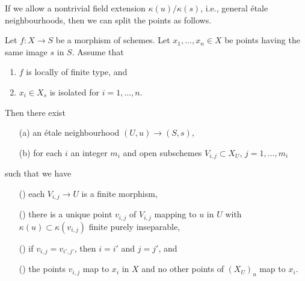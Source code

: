 \noindent
If we allow a nontrivial field extension $\kappa(u)/\kappa(s)$, i.e.,
general \'etale neighbourhoods, then we can split the points as follows.

\begin{lemma}
\label{lemma-etale-makes-quasi-finite-finite-multiple-points-var}
Let $f : X \to S$ be a morphism of schemes.
Let $x_1, \ldots, x_n \in X$ be points having the same image $s$ in $S$.
Assume that
\begin{enumerate}
\item $f$ is locally of finite type, and
\item $x_i \in X_s$ is isolated for $i = 1, \ldots, n$.
\end{enumerate}
Then there exist
\begin{enumerate}
\item[(a)] an \'etale neighbourhood $(U, u) \to (S, s)$,
\item[(b)] for each $i$ an integer $m_i$ and
open subschemes $V_{i, j} \subset X_U$, $j = 1, \ldots, m_i$
\end{enumerate}
such that we have
\begin{enumerate}
\item[(\romannumeral1)] each $V_{i, j} \to U$ is a finite morphism,
\item[(\romannumeral2)] there is a unique point $v_{i, j}$ of $V_{i, j}$
mapping to $u$ in $U$ with $\kappa(u) \subset \kappa(v_{i, j})$
finite purely inseparable,
\item[(\romannumeral4)] if $v_{i, j} = v_{i', j'}$, then $i = i'$ and
$j = j'$, and
\item[(\romannumeral3)] the points $v_{i, j}$ map to $x_i$ in $X$ and
no other points of $(X_U)_u$ map to $x_i$.
\end{enumerate}
\end{lemma}

